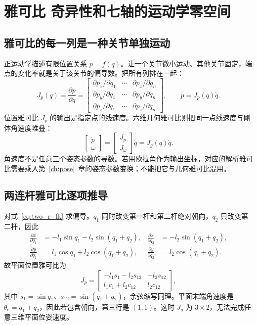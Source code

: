 \chapter{雅可比 奇异性和七轴的运动学零空间}\label{ch:jacobian}
\section{雅可比的每一列是一种关节单独运动}
正运动学描述有限位置关系 $p=f(q)$。让一个关节微小运动、其他关节固定，端点的变化率就是关于该关节的偏导数。把所有列排在一起：
\begin{equation}
 J_p(q)=\frac{\partial p}{\partial q}
 =\begin{bmatrix}
 \partial p_x/\partial q_1&\cdots&\partial p_x/\partial q_n\\
 \partial p_y/\partial q_1&\cdots&\partial p_y/\partial q_n\\
 \partial p_z/\partial q_1&\cdots&\partial p_z/\partial q_n
 \end{bmatrix},
 \qquad\dot p=J_p(q)\dot q.
\end{equation}
位置雅可比 $J_p$ 的输出是指定点的线速度。六维几何雅可比则把同一点线速度与刚体角速度堆叠：
\begin{equation}
 \begin{bmatrix}\dot p\\\omega\end{bmatrix}
 =\begin{bmatrix}J_p\\J_\omega\end{bmatrix}\dot q
 =J_g(q)\dot q.
\end{equation}
角速度不是任意三个姿态参数的导数。若用欧拉角作为输出坐标，对应的解析雅可比需要乘入第~\ref{ch:pose}~章的姿态参数变换；不能把它与几何雅可比混用。

\section{两连杆雅可比逐项推导}
对式~\eqref{eq:two_r_fk} 求偏导。$q_1$ 同时改变第一杆和第二杆绝对朝向，$q_2$ 只改变第二杆，因此
\begin{align}
 \frac{\partial x}{\partial q_1}&=-l_1\sin q_1-l_2\sin(q_1+q_2),
 &\frac{\partial x}{\partial q_2}&=-l_2\sin(q_1+q_2),\\
 \frac{\partial y}{\partial q_1}&=l_1\cos q_1+l_2\cos(q_1+q_2),
 &\frac{\partial y}{\partial q_2}&=l_2\cos(q_1+q_2).
\end{align}
故平面位置雅可比为
\begin{equation}
 J_p=\begin{bmatrix}
 -l_1s_1-l_2s_{12}&-l_2s_{12}\\
 l_1c_1+l_2c_{12}&l_2c_{12}
 \end{bmatrix},
\end{equation}
其中 $s_1=\sin q_1$、$s_{12}=\sin(q_1+q_2)$，余弦缩写同理。平面末端角速度是 $\dot\theta_e=\dot q_1+\dot q_2$，因此若包含朝向，第三行是 $(1,1)$。这时 $J_g$ 为 $3\times2$，无法完成任意三维平面位姿速度。

